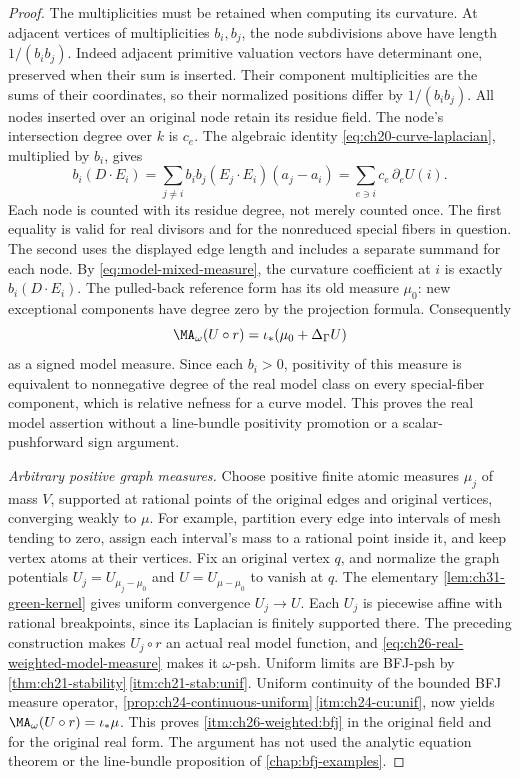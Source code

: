 \begin{proof}
The multiplicities must be retained when computing its curvature.  At
adjacent vertices of multiplicities \(b_i,b_j\), the node subdivisions
above have length \(1/(b_i b_j)\).  Indeed adjacent primitive valuation
vectors have determinant one, preserved when their sum is inserted.
Their component multiplicities are the sums of their coordinates, so
their normalized positions differ by \(1/(b_i b_j)\).
All nodes inserted over an original node retain its residue field.
The node's intersection degree over
\(k\) is \(c_e\).  The algebraic identity
\eqref{eq:ch20-curve-laplacian}, multiplied by \(b_i\), gives
\[
 b_i(D\cdot E_i)
   =\sum_{j\ne i}b_i b_j(E_j\cdot E_i)(a_j-a_i)
   =\sum_{e\ni i}c_e\,\partial_e U(i).
\]
Each node is counted with its residue degree, not merely counted once.
The first equality is valid for real divisors and for the nonreduced
special fibers in question.  The second uses the displayed edge length
and includes a separate summand for each node.
By \eqref{eq:model-mixed-measure}, the curvature coefficient at \(i\)
is exactly \(b_i(D\cdot E_i)\).  The pulled-back reference form has its
old measure \(\mu_0\): new exceptional components have degree zero by
the projection formula.  Consequently
\begin{equation}
\label{eq:ch26-real-weighted-model-measure}
 \MA_\omega(U\circ r)=\iota_*(\mu_0+\Delta_\Gamma U)
\end{equation}
as a signed model measure.  Since each \(b_i>0\), positivity of this
measure is equivalent to nonnegative degree of the real model class on
every special-fiber component, which is relative nefness for a curve
model.  This proves the real model assertion without a line-bundle
positivity promotion or a scalar-pushforward sign argument.

\emph{Arbitrary positive graph measures.}
Choose positive finite atomic measures \(\mu_j\) of mass \(V\), supported
at rational points of the original edges and original vertices, converging
weakly to \(\mu\).  For example, partition every edge into intervals
of mesh tending to zero, assign each interval's mass to a rational point
inside it, and keep vertex atoms at their vertices.
Fix an original vertex \(q\), and normalize the graph potentials
\(U_j=U_{\mu_j-\mu_0}\) and \(U=U_{\mu-\mu_0}\) to vanish at \(q\).
The elementary \cref{lem:ch31-green-kernel} gives uniform convergence
\(U_j\to U\).  Each \(U_j\) is piecewise affine with rational
breakpoints, since its Laplacian is finitely supported there.  The preceding
construction makes \(U_j\circ r\) an actual real model function, and
\eqref{eq:ch26-real-weighted-model-measure} makes it \(\omega\)-psh.
Uniform limits are BFJ-psh by
\cref{thm:ch21-stability}\,\cref{itm:ch21-stab:unif}.
Uniform continuity of the bounded BFJ measure operator,
\cref{prop:ch24-continuous-uniform}\,\cref{itm:ch24-cu:unif}, now yields
\(\MA_\omega(U\circ r)=\iota_*\mu\).
This proves \cref{itm:ch26-weighted:bfj} in the original field and for
the original real form.  The argument has not used the analytic equation
theorem or the line-bundle proposition of \cref{chap:bfj-examples}.


\end{proof}

